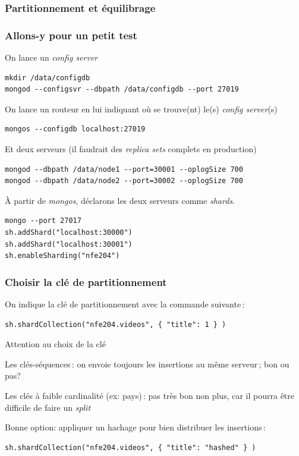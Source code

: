 \begin{frame}
\frametitle{Partitionnement et équilibrage}


\end{frame}



\begin{frame}[fragile]
\frametitle{Allons-y pour un petit test}

On lance un \textit{config server}

\begin{verbatim}
mkdir /data/configdb
mongod --configsvr --dbpath /data/configdb --port 27019
\end{verbatim}

On lance un routeur en lui indiquant où se trouve(nt) le(s) \textit{config server}(s)

\begin{verbatim}
mongos --configdb localhost:27019
\end{verbatim}

Et deux serveurs (il faudrait des \textit{replica sets} complets en production)
\begin{verbatim}
mongod --dbpath /data/node1 --port=30001 --oplogSize 700
mongod --dbpath /data/node2 --port=30002 --oplogSize 700
\end{verbatim}

À partir de \textit{mongos}, déclarons les deux serveurs comme \textit{shards}.

\begin{verbatim}
mongo --port 27017
sh.addShard("localhost:30000")
sh.addShard("localhost:30001")
sh.enableSharding("nfe204")
\end{verbatim}

\end{frame}

\begin{frame}[fragile]
\frametitle{Choisir la clé de partitionnement}

On indique la clé de partitionnement avec la commande suivante\,:

\begin{verbatim}
sh.shardCollection("nfe204.videos", { "title": 1 } )
\end{verbatim}

Attention au choix de la clé

\begin{redbullet}
  \item Les clés-séquences\,:  on envoie toujours les insertions au même serveur\,; bon ou pas?
  \item Les clés à faible cardinalité (ex: pays)\,: pas très bon non plus, car 
               il pourra être difficile de faire un \textit{split}
\end{redbullet}

Bonne option: appliquer un hachage pour bien distribuer les insertions\,:

\begin{verbatim}
sh.shardCollection("nfe204.videos", { "title": "hashed" } )
\end{verbatim}

\end{frame}


